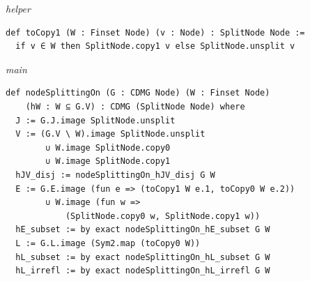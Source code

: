 {\small\textit{helper}}
\begin{verbatim}
def toCopy1 (W : Finset Node) (v : Node) : SplitNode Node :=
  if v ∈ W then SplitNode.copy1 v else SplitNode.unsplit v
\end{verbatim}
{\small\textit{main}}
\begin{verbatim}
def nodeSplittingOn (G : CDMG Node) (W : Finset Node)
    (hW : W ⊆ G.V) : CDMG (SplitNode Node) where
  J := G.J.image SplitNode.unsplit
  V := (G.V \ W).image SplitNode.unsplit
        ∪ W.image SplitNode.copy0
        ∪ W.image SplitNode.copy1
  hJV_disj := nodeSplittingOn_hJV_disj G W
  E := G.E.image (fun e => (toCopy1 W e.1, toCopy0 W e.2))
        ∪ W.image (fun w =>
            (SplitNode.copy0 w, SplitNode.copy1 w))
  hE_subset := by exact nodeSplittingOn_hE_subset G W
  L := G.L.image (Sym2.map (toCopy0 W))
  hL_subset := by exact nodeSplittingOn_hL_subset G W
  hL_irrefl := by exact nodeSplittingOn_hL_irrefl G W
\end{verbatim}
~%

\vspace{\appendixNotesGap}

